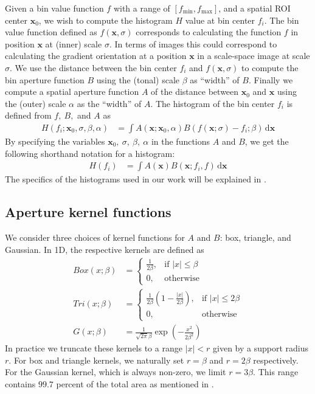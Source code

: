 \documentclass[thesis.tex]{subfiles}
\def\x{\mathbf{x}}
\begin{document}
Given a bin value function $f$ with a range of $[f_\text{min},f_\text{max}]$, and a spatial ROI center $\x_0$, we wish to compute the histogram $H$ value at bin center $f_i$.
The bin value function defined as $f(\x,\sigma)$ corresponds to calculating the function $f$ in position $\x$ at (inner) scale $\sigma$. In terms of images this could correspond to calculating the gradient orientation at a position $\x$ in a scale-space image at scale $\sigma$.
We use the distance between the bin center $f_i$ and $f(\x,\sigma)$ to compute the bin aperture function $B$ using the (tonal) scale $\beta$ as ``width'' of $B$. Finally we compute a spatial aperture function $A$ of the distance between $\x_0$ and $\x$ using the (outer) scale $\alpha$ as the ``width'' of $A$. The histogram of the bin center $f_i$ is defined from $f,~B,$ and $A$ as
%
\begin{align}
	\label{eq:histogramLong}
	H(f_i;\x_0,\sigma,\beta,\alpha) &= \int A(\x;\x_0,\alpha) B(f(\x;\sigma)-f_i;\beta)\,\text{d}\x
\end{align}
%
By specifying the variables $\x_0,~\sigma,~\beta,~\alpha$ in the functions $A$ and $B$, we get the following shorthand notation for a histogram:
%
\begin{align}
	\label{eq:histogramShort}
	H(f_i) &= \int A(\x) B(\x;f_i,f)\,\text{d}\x
\end{align}
%
The specifics of the histograms used in our work will be explained in .
%
\subsection{Aperture kernel functions}
\label{sec:apertureKernelFunctions}
%
We consider three choices of kernel functions for $A$ and $B$: box, triangle, and Gaussian. In 1D, the respective kernels are defined as
%
\begin{align*}
\mathit{Box} (x; \beta) &= 
\begin{cases}
    \frac{1}{2 \beta},& \text{if } |x| \leq \beta \\
    0,              & \text{otherwise}
\end{cases} \\
\mathit{Tri} (x; \beta) &= 
\begin{cases}
    \frac{1}{2 \beta} \left( 1 - \frac{| x |}{2 \beta} \right) ,& \text{if } |x| \leq 2 \beta \\
    0,              & \text{otherwise}
\end{cases} \\
G(x;\beta) &= \frac{1}{\sqrt{2\pi} \beta}
\exp\left( -\frac{x^2}{2 \beta^2} \right)
\end{align*}
%
In practice we truncate these kernels to a range $|x| < r$ given by a support radius $r$. For box and triangle kernels, we naturally set $r = \beta$ and $r = 2 \beta$ respectively. For the Gaussian kernel, which is always non-zero, we limit $r = 3 \beta$. This range contains $99.7$ percent of the total area as mentioned in .
\end{document}
